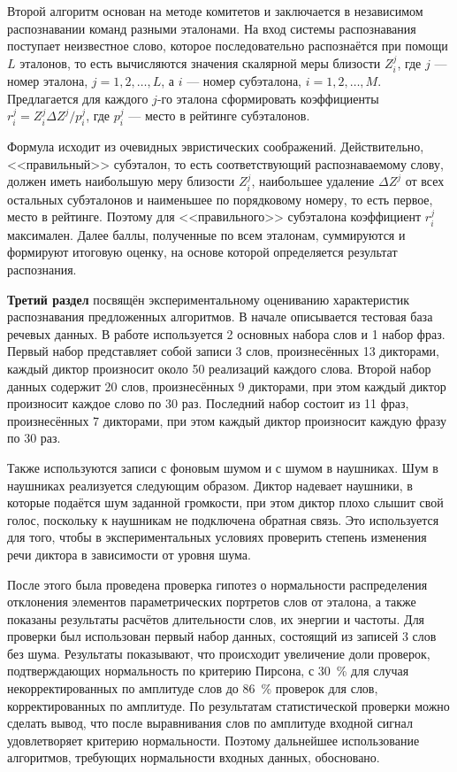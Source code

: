 Второй алгоритм основан на методе комитетов и заключается в независимом распознавании команд разными эталонами.
На вход системы распознавания поступает неизвестное слово, которое последовательно распознаётся при помощи $L$ эталонов, то есть вычисляются значения скалярной меры близости $Z_i^j$, где $j$ --- номер эталона, $j = 1, 2, \dots, L$, а $i$ --- номер субэталона, $i = 1, 2, \dots, M$.
Предлагается для каждого $j$-го эталона сформировать коэффициенты $r_i^j = Z_i^j \Delta Z^j/ p_i^j$, где $p_i^j$ --- место в рейтинге субэталонов.

Формула исходит из очевидных эвристических соображений.
Действительно, <<правильный>> субэталон, то есть соответствующий распознаваемому слову, должен иметь наибольшую меру близости $Z_i^j$, наибольшее удаление $\Delta Z^j$ от всех остальных субэталонов и наименьшее по порядковому номеру, то есть первое, место в рейтинге.
Поэтому для <<правильного>> субэталона коэффициент $r_i^j$ максимален. 
Далее баллы, полученные по всем эталонам, суммируются и формируют итоговую оценку, на основе которой определяется результат распознания.


\textbf{Третий раздел} посвящён экспериментальному оцениванию характеристик распознавания предложенных алгоритмов.
В начале описывается тестовая база речевых данных.
В работе используется 2 основных набора слов и 1 набор фраз.
Первый набор представляет собой записи 3 слов, произнесённых 13 дикторами, каждый диктор произносит около 50 реализаций каждого слова.
Второй набор данных содержит 20 слов, произнесённых 9 дикторами, при этом каждый диктор произносит каждое слово по 30 раз.
Последний набор состоит из 11 фраз, произнесённых 7 дикторами, при этом каждый диктор произносит каждую фразу по 30 раз.

Также используются записи с фоновым шумом и с шумом в наушниках.
Шум в наушниках реализуется следующим образом.
Диктор надевает наушники, в которые подаётся шум заданной громкости, при этом диктор плохо слышит свой голос, поскольку к наушникам не подключена обратная связь.
Это используется для того, чтобы в экспериментальных условиях проверить степень изменения речи диктора в зависимости от уровня шума.

После этого была проведена проверка гипотез о нормальности распределения отклонения элементов параметрических портретов слов от эталона, а также показаны результаты расчётов длительности слов, их энергии и частоты.
Для проверки был использован первый набор данных, состоящий из записей 3 слов без шума.
Результаты показывают, что происходит увеличение доли проверок, подтверждающих нормальность по критерию Пирсона, с 30~\% для случая некорректированных по амплитуде слов до 86~\% проверок для слов, корректированных по амплитуде.
По результатам статистической проверки можно сделать вывод, что после выравнивания слов по амплитуде входной сигнал удовлетворяет критерию нормальности.
Поэтому дальнейшее использование алгоритмов, требующих нормальности входных данных, обосновано.

